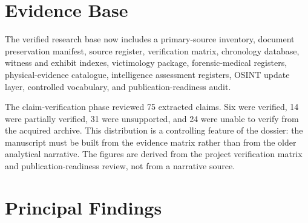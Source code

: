 \section{Evidence Base}

The verified research base now includes a primary-source inventory, document preservation manifest, source register, verification matrix, chronology database, witness and exhibit indexes, victimology package, forensic-medical registers, physical-evidence catalogue, intelligence assessment registers, OSINT update layer, controlled vocabulary, and publication-readiness audit.

The claim-verification phase reviewed 75 extracted claims. Six were verified, 14 were partially verified, 31 were unsupported, and 24 were unable to verify from the acquired archive. This distribution is a controlling feature of the dossier: the manuscript must be built from the evidence matrix rather than from the older analytical narrative. The figures are derived from the project verification matrix and publication-readiness review, not from a narrative source.

\section{Principal Findings}


